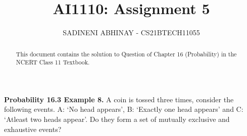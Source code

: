 \documentclass[journal,12pt,twocolumn]{IEEEtran}
\begin{document}
	
	
	\providecommand{\mbf}{\mathbf}
	\providecommand{\pr}[1]{\ensuremath{\Pr\left(#1\right)}}
	\providecommand{\qfunc}[1]{\ensuremath{Q\left(#1\right)}}
	\providecommand{\sbrak}[1]{\ensuremath{{}\left[#1\right]}}
	\providecommand{\lsbrak}[1]{\ensuremath{{}\left[#1\right.}}
	\providecommand{\rsbrak}[1]{\ensuremath{{}\left.#1\right]}}
	\providecommand{\brak}[1]{\ensuremath{\left(#1\right)}}
	\providecommand{\lbrak}[1]{\ensuremath{\left(#1\right.}}
	\providecommand{\rbrak}[1]{\ensuremath{\left.#1\right)}}
	\providecommand{\cbrak}[1]{\ensuremath{\left\{#1\right\}}}
	\providecommand{\lcbrak}[1]{\ensuremath{\left\{#1\right.}}
	\providecommand{\rcbrak}[1]{\ensuremath{\left.#1\right\}}}
	\providecommand{\dec}[2]{\ensuremath{\overset{#1}{\underset{#2}{\gtrless}}}}
	\newcommand{\myvec}[1]{\ensuremath{\begin{pmatrix}#1\end{pmatrix}}}
	\newcommand{\mydet}[1]{\ensuremath{\begin{vmatrix}#1\end{vmatrix}}}
	\newcommand*{\permcomb}[4][0mu]{{{}^{#3}\mkern#1#2_{#4}}}
	\newcommand*{\perm}[1][-3mu]{\permcomb[#1]{P}}
	\newcommand*{\comb}[1][-1mu]{\permcomb[#1]{C}}
		\title{
				AI1110: Assignment 5
		}
		\author{
			SADINENI ABHINAY - CS21BTECH11055
		}
			
	\maketitle
	\begin{abstract}
		This document contains the solution to Question of Chapter 16 (Probability) in the NCERT Class 11 Textbook.
	\end{abstract}
	
	\textbf{Probability 16.3 Example 8.}
A coin is tossed three times, consider the following events.
A: ‘No head appears’, B: ‘Exactly one head appears’ and C: ‘Atleast two heads
appear’.
Do they form a set of mutually exclusive and exhaustive events?
	
\end{document}
